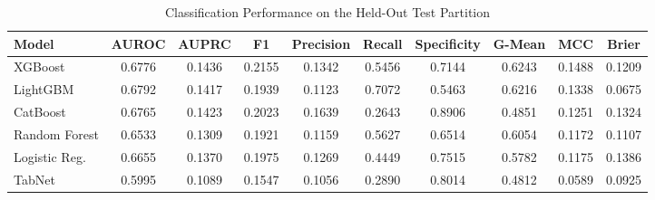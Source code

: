 \begin{table}
\centering
\caption{Classification Performance on the Held-Out Test Partition}
\label{tab:results}
\begin{tabular}{lccccccccc}
\toprule
Model & AUROC & AUPRC & F1 & Precision & Recall & Specificity & G-Mean & MCC & Brier \\
\midrule
XGBoost & 0.6776 & 0.1436 & 0.2155 & 0.1342 & 0.5456 & 0.7144 & 0.6243 & 0.1488 & 0.1209 \\
LightGBM & 0.6792 & 0.1417 & 0.1939 & 0.1123 & 0.7072 & 0.5463 & 0.6216 & 0.1338 & 0.0675 \\
CatBoost & 0.6765 & 0.1423 & 0.2023 & 0.1639 & 0.2643 & 0.8906 & 0.4851 & 0.1251 & 0.1324 \\
Random Forest & 0.6533 & 0.1309 & 0.1921 & 0.1159 & 0.5627 & 0.6514 & 0.6054 & 0.1172 & 0.1107 \\
Logistic Reg. & 0.6655 & 0.1370 & 0.1975 & 0.1269 & 0.4449 & 0.7515 & 0.5782 & 0.1175 & 0.1386 \\
TabNet & 0.5995 & 0.1089 & 0.1547 & 0.1056 & 0.2890 & 0.8014 & 0.4812 & 0.0589 & 0.0925 \\
\bottomrule
\end{tabular}
\end{table}
